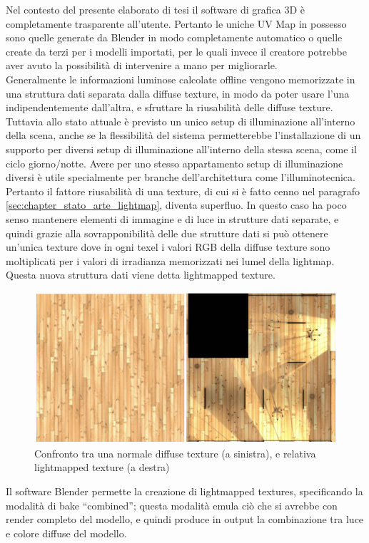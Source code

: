 Nel contesto del presente elaborato di tesi il software di grafica 3D è completamente trasparente all’utente. Pertanto le uniche UV Map in possesso sono quelle generate da Blender in modo completamente automatico o quelle create da terzi per i modelli importati, per le quali invece il creatore potrebbe aver avuto la possibilità di intervenire a mano per migliorarle.
\\
Generalmente le informazioni luminose calcolate offline vengono memorizzate in una struttura dati separata dalla diffuse texture, in modo da poter usare l’una indipendentemente dall’altra, e sfruttare la riusabilità delle diffuse texture.
\\ 
Tuttavia allo stato attuale è previsto un unico setup di illuminazione all’interno della scena, anche se la flessibilità del sistema permetterebbe l’installazione di un supporto per diversi setup di illuminazione all’interno della stessa scena, come il ciclo giorno/notte.  Avere per uno stesso appartamento setup di illuminazione diversi è utile specialmente per branche dell’architettura come l’illuminotecnica. Pertanto il fattore riusabilità di una texture, di cui si è fatto cenno nel paragrafo \ref{sec:chapter_stato_arte_lightmap}, diventa superfluo. In questo caso ha poco senso mantenere elementi di immagine e di luce in strutture dati separate, e quindi grazie alla sovrapponibilità delle due strutture dati si può ottenere un’unica texture dove in ogni texel i valori RGB della diffuse texture sono moltiplicati per i valori di irradianza memorizzati nei lumel della lightmap. Questa nuova struttura dati viene detta lightmapped texture. 
\\
\begin{figure}[htb]
 \centering
 \includegraphics[width=1\linewidth]{images/chapter_lrl/lrl_li_te.png}\hfill
 \caption[Lightmapped texture]{Confronto tra una normale diffuse texture (a sinistra), e relativa lightmapped texture (a destra)}
 \label{fig:lrl_li_te}
\end{figure}
Il software Blender permette la creazione di lightmapped textures, specificando la modalità di bake “combined”; questa modalità emula ciò che si avrebbe con render completo del modello, e quindi produce in output la combinazione tra luce e colore diffuse del modello.